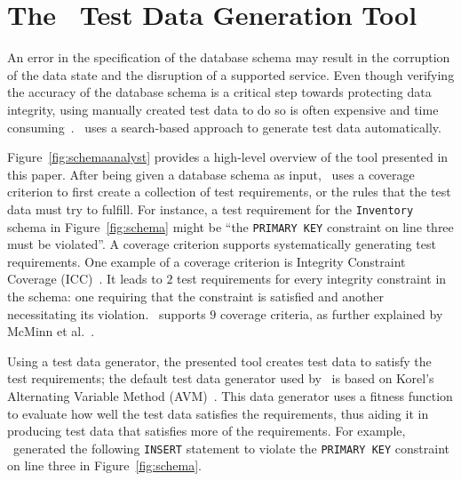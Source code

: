 \section{The \sa~Test Data Generation Tool}\label{sec:technique}


An error in the specification of the database schema may result in the corruption of the data state and the disruption
of a supported service.  Even though verifying the accuracy of the database schema is a critical step towards protecting
data integrity, using manually created test data to do so is often expensive and time
consuming~\cite{kapfhammer2013search}.  \sa~uses a search-based approach to generate test data automatically.


Figure~\ref{fig:schemaanalyst} provides a high-level overview of the tool presented in this paper.  After being given a
database schema as input, \sa~uses a coverage criterion to first create a collection of test requirements, or the rules
that the test data must try to fulfill.  For instance, a test requirement for the \texttt{Inventory} schema in
Figure~\ref{fig:schema} might be ``the \texttt{PRIMARY KEY} constraint on line three must be violated''. A coverage
criterion supports systematically generating test requirements.  One example of a coverage criterion is Integrity
Constraint Coverage (ICC)~\cite{mcminn2015effectiveness}. It leads to $2$ test requirements for every integrity
constraint in the schema: one requiring that the constraint is satisfied and another necessitating its violation.
\sa~supports $9$ coverage criteria, as further explained by McMinn et al.~\cite{mcminn2015effectiveness}.


Using a test data generator, the presented tool creates test data to satisfy the test requirements; the default test
data generator used by \sa~is based on Korel's Alternating Variable Method (AVM)~\cite{Korel:AVM}. This data generator
uses a fitness function to evaluate how well the test data satisfies the requirements, thus aiding it in producing
test data that satisfies more of the requirements. For example, \sa~generated the following \texttt{INSERT} statement to
violate the \texttt{PRIMARY KEY} constraint on line three in Figure~\ref{fig:schema}.

